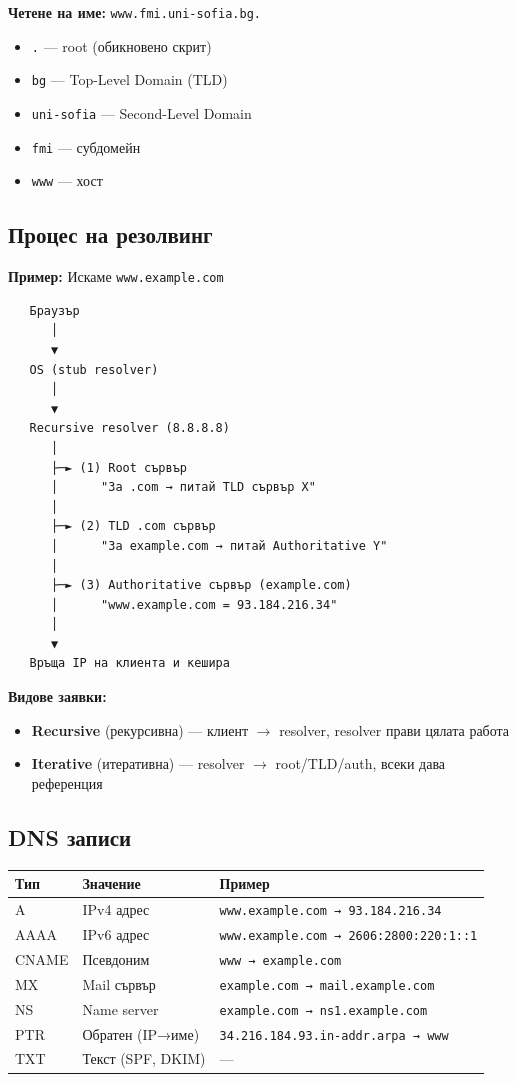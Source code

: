 \documentclass[12pt,a4paper]{article}
\begin{document}
\textbf{Четене на име:} \texttt{www.fmi.uni-sofia.bg.}
\begin{itemize}
    \item \texttt{.} — root (обикновено скрит)
    \item \texttt{bg} — Top-Level Domain (TLD)
    \item \texttt{uni-sofia} — Second-Level Domain
    \item \texttt{fmi} — субдомейн
    \item \texttt{www} — хост
\end{itemize}

\subsection{Процес на резолвинг}

\textbf{Пример:} Искаме \texttt{www.example.com}

\begin{lstlisting}
   Браузър
      │
      ▼
   OS (stub resolver)
      │
      ▼
   Recursive resolver (8.8.8.8)
      │
      ├─► (1) Root сървър
      │      "За .com → питай TLD сървър X"
      │
      ├─► (2) TLD .com сървър
      │      "За example.com → питай Authoritative Y"
      │
      ├─► (3) Authoritative сървър (example.com)
      │      "www.example.com = 93.184.216.34"
      │
      ▼
   Връща IP на клиента и кешира
\end{lstlisting}

\textbf{Видове заявки:}
\begin{itemize}
    \item \textbf{Recursive} (рекурсивна) — клиент $\rightarrow$ resolver, resolver прави цялата работа
    \item \textbf{Iterative} (итеративна) — resolver $\rightarrow$ root/TLD/auth, всеки дава референция
\end{itemize}

\subsection{DNS записи}

\begin{center}
\begin{tabular}{|l|l|p{5cm}|}
\hline
\textbf{Тип} & \textbf{Значение} & \textbf{Пример} \\
\hline
A & IPv4 адрес & \texttt{www.example.com → 93.184.216.34} \\
\hline
AAAA & IPv6 адрес & \texttt{www.example.com → 2606:2800:220:1::1} \\
\hline
CNAME & Псевдоним & \texttt{www → example.com} \\
\hline
MX & Mail сървър & \texttt{example.com → mail.example.com} \\
\hline
NS & Name server & \texttt{example.com → ns1.example.com} \\
\hline
PTR & Обратен (IP→име) & \texttt{34.216.184.93.in-addr.arpa → www} \\
\hline
TXT & Текст (SPF, DKIM) & — \\
\hline
\end{tabular}
\end{center}
\end{document}
